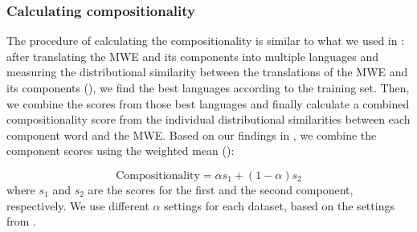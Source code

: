 \documentclass[output=paper
,modfonts
,nonflat]{langsci/langscibook}
\begin{document}
\subsubsection{Calculating compositionality}
\label{sec:computing-compositionality}
The procedure of calculating the compositionality is similar to what
we used in : after translating the MWE and its
components into multiple languages and measuring the distributional
similarity between the translations of the MWE and its components
(), we find the best languages according to the
training set. Then, we combine the scores from those best languages
and finally calculate a combined compositionality score from the
individual distributional similarities between each component word and
the MWE. Based on our findings in , we combine the
component scores using the weighted mean ():

\begin{equation}
  \text{Compositionality} = \alpha s_{1} + (1-\alpha) s_{2}
  \label{eq:comp}
\end{equation} 
where $s_{1}$ and $s_{2}$ are the scores for the first and the second
component, respectively. We use different $\alpha$ settings for each
dataset, based on the settings from .
\end{document}

